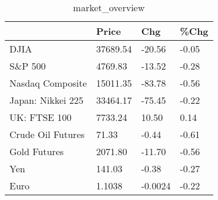 \documentclass{article}%
\begin{document}
%


\begin{table}[htbp]%
\caption{market\_overview}%
\centering%
\begin{adjustbox}{width=1\textwidth}%
\begin{tabular}{llll}
\toprule
                  &    Price &     Chg &  \%Chg \\
\midrule
             DJIA & 37689.54 &  -20.56 & -0.05 \\
          S\&P 500 &  4769.83 &  -13.52 & -0.28 \\
 Nasdaq Composite & 15011.35 &  -83.78 & -0.56 \\
Japan: Nikkei 225 & 33464.17 &  -75.45 & -0.22 \\
     UK: FTSE 100 &  7733.24 &   10.50 &  0.14 \\
Crude Oil Futures &    71.33 &   -0.44 & -0.61 \\
     Gold Futures &  2071.80 &  -11.70 & -0.56 \\
              Yen &   141.03 &   -0.38 & -0.27 \\
             Euro &   1.1038 & -0.0024 & -0.22 \\
\bottomrule
\end{tabular}
%
\end{adjustbox}%
\end{table}

%
\end{document}
